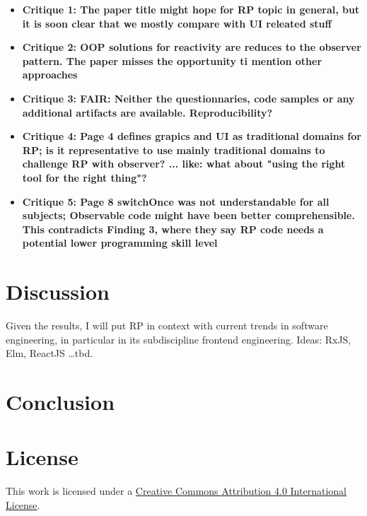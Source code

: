 \documentclass[12pt,a4paper]{article}
\begin{document}
\begin{itemize}
	\item \textbf{Critique 1: The paper title might hope for RP topic in general, but it is soon clear that we mostly compare with UI releated stuff}
	\item \textbf{Critique 2: OOP solutions for reactivity are reduces to the observer pattern. The paper misses the opportunity ti mention other approaches}
	\item \textbf{Critique 3: FAIR: Neither the questionnaries, code samples or any additional artifacts are available. Reproducibility?}
	\item \textbf{Critique 4: Page 4 defines grapics and UI as traditional domains for RP; is it representative to use mainly traditional domains to challenge RP with observer? ... like: what about "using the right tool for the right thing"?}
	\item \textbf{Critique 5: Page 8 switchOnce was not understandable for all subjects; Observable code might have been better comprehensible. This contradicts Finding 3, where they say RP code needs a potential lower programming skill level}
\end{itemize}

\section{Discussion}
Given the results, I will put RP in context with current trends in software engineering, in particular in its subdiscipline frontend engineering.
Ideas: RxJS, Elm, ReactJS \dots tbd.

\section{Conclusion}





\section*{License}
\ccby\thinspace\thinspace This work is licensed under a \href{https://creativecommons.org/licenses/by/4.0/}{Creative Commons Attribution 4.0 International License}.
\end{document}
